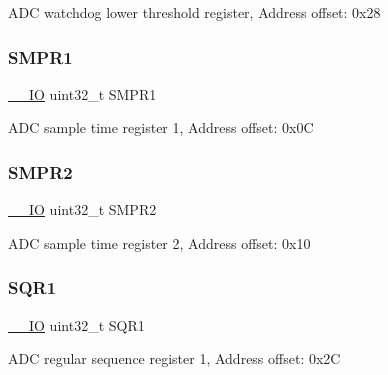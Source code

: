 A\+DC watchdog lower threshold register, Address offset\+: 0x28 \mbox{\label{struct_a_d_c___type_def_af9d6c604e365c7d9d7601bf4ef373498}} 
\subsubsection{\texorpdfstring{S\+M\+P\+R1}{SMPR1}}
{\footnotesize\ttfamily \mbox{\hyperlink{core__sc300_8h_aec43007d9998a0a0e01faede4133d6be}{\+\_\+\+\_\+\+IO}} uint32\+\_\+t S\+M\+P\+R1}

A\+DC sample time register 1, Address offset\+: 0x0C \mbox{\label{struct_a_d_c___type_def_a6ac83fae8377c7b7fcae50fa4211b0e8}} 
\subsubsection{\texorpdfstring{S\+M\+P\+R2}{SMPR2}}
{\footnotesize\ttfamily \mbox{\hyperlink{core__sc300_8h_aec43007d9998a0a0e01faede4133d6be}{\+\_\+\+\_\+\+IO}} uint32\+\_\+t S\+M\+P\+R2}

A\+DC sample time register 2, Address offset\+: 0x10 \mbox{\label{struct_a_d_c___type_def_a3302e1bcfdfbbfeb58779d0761fb377c}} 
\subsubsection{\texorpdfstring{S\+Q\+R1}{SQR1}}
{\footnotesize\ttfamily \mbox{\hyperlink{core__sc300_8h_aec43007d9998a0a0e01faede4133d6be}{\+\_\+\+\_\+\+IO}} uint32\+\_\+t S\+Q\+R1}

A\+DC regular sequence register 1, Address offset\+: 0x2C \mbox{\label{struct_a_d_c___type_def_aab440b0ad8631f5666dd32768a89cf60}} 
